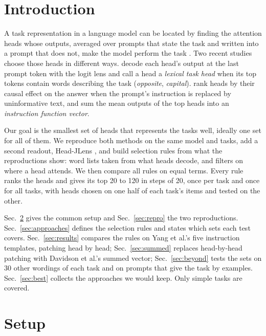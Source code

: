 \documentclass[10pt,a4paper]{article}
\begin{document}
\section{Introduction}

A task representation in a language model can be located by finding the attention heads whose outputs, averaged over prompts that state the task and written into a prompt that does not, make the model perform the task \citep{todd2024function}. Two recent studies choose those heads in different ways. \citet{yang2026shared} decode each head's output at the last prompt token with the logit lens and call a head a \emph{lexical task head} when its top tokens contain words describing the task (\emph{opposite}, \emph{capital}). \citet{davidson2025different} rank heads by their causal effect on the answer when the prompt's instruction is replaced by uninformative text, and sum the mean outputs of the top heads into an \emph{instruction function vector}.

Our goal is the smallest set of heads that represents the tasks well, ideally one set for all of them. We reproduce both methods on the same model and tasks, add a second readout, Head-JLens \citep{merlo2026headjlens}, and build selection rules from what the reproductions show: word lists taken from what heads decode, and filters on where a head attends. We then compare all rules on equal terms. Every rule ranks the heads and gives its top 20 to 120 in steps of 20, once per task and once for all tasks, with heads chosen on one half of each task's items and tested on the other.

Sec.~\ref{sec:setup} gives the common setup and Sec.~\ref{sec:repro} the two reproductions. Sec.~\ref{sec:approaches} defines the selection rules and states which sets each test covers. Sec.~\ref{sec:results} compares the rules on Yang et al.'s five instruction templates, patching head by head; Sec.~\ref{sec:summed} replaces head-by-head patching with Davidson et al.'s summed vector; Sec.~\ref{sec:beyond} tests the sets on 30 other wordings of each task and on prompts that give the task by examples. Sec.~\ref{sec:best} collects the approaches we would keep. Only simple tasks are covered.

\section{Setup}\label{sec:setup}
\end{document}
